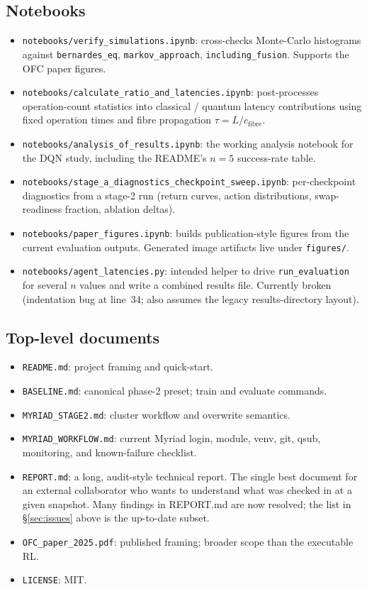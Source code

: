 \documentclass[11pt]{article}
\newcommand{\code}[1]{\texttt{#1}}
\newcommand{\file}[1]{\texttt{\small #1}}
\begin{document}
\subsection{Notebooks}
\begin{itemize}
  \item \file{notebooks/verify\_simulations.ipynb}: cross-checks Monte-Carlo histograms against \code{bernardes\_eq}, \code{markov\_approach}, \code{including\_fusion}. Supports the OFC paper figures.
  \item \file{notebooks/calculate\_ratio\_and\_latencies.ipynb}: post-processes operation-count statistics into classical / quantum latency contributions using fixed operation times and fibre propagation $\tau = L/c_{\text{fibre}}$.
  \item \file{notebooks/analysis\_of\_results.ipynb}: the working analysis notebook for the DQN study, including the README's $n=5$ success-rate table.
  \item \file{notebooks/stage\_a\_diagnostics\_checkpoint\_sweep.ipynb}: per-checkpoint diagnostics from a stage-2 run (return curves, action distributions, swap-readiness fraction, ablation deltas).
  \item \file{notebooks/paper\_figures.ipynb}: builds publication-style figures from the current evaluation outputs. Generated image artifacts live under \file{figures/}.
  \item \file{notebooks/agent\_latencies.py}: intended helper to drive \code{run\_evaluation} for several $n$ values and write a combined results file. Currently broken (indentation bug at line~34; also assumes the legacy results-directory layout).
\end{itemize}

\subsection{Top-level documents}
\begin{itemize}
  \item \file{README.md}: project framing and quick-start.
  \item \file{BASELINE.md}: canonical phase-2 preset; train and evaluate commands.
  \item \file{MYRIAD\_STAGE2.md}: cluster workflow and overwrite semantics.
  \item \file{MYRIAD\_WORKFLOW.md}: current Myriad login, module, venv, git,
  qsub, monitoring, and known-failure checklist.
  \item \file{REPORT.md}: a long, audit-style technical report. The single best document for an external collaborator who wants to understand what was checked in at a given snapshot. Many findings in REPORT.md are now resolved; the list in \S\ref{sec:issues} above is the up-to-date subset.
  \item \file{OFC\_paper\_2025.pdf}: published framing; broader scope than the executable RL.
  \item \file{LICENSE}: MIT.
\end{itemize}
\end{document}
